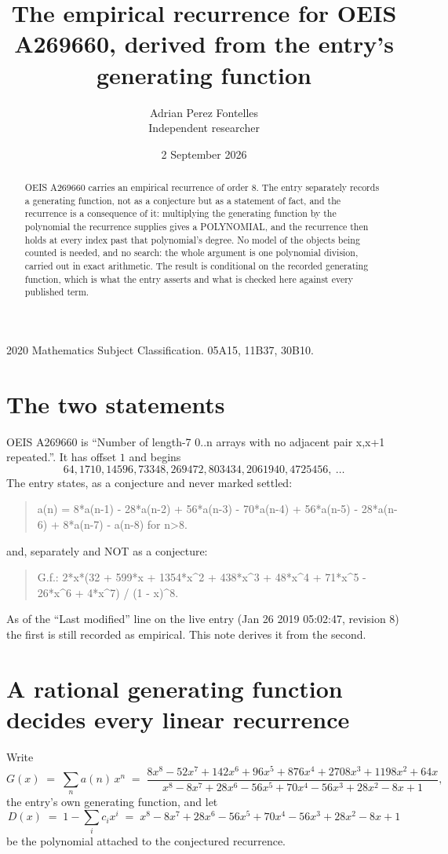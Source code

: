 \documentclass[11pt,a4paper]{article}
\title{The empirical recurrence for OEIS A269660, derived from the entry's generating function}
\author{Adrian Perez Fontelles\\ \small Independent researcher}
\date{2 September 2026}
\theoremstyle{plain}
\theoremstyle{definition}
\begin{document}
\maketitle

\begin{abstract}
OEIS A269660 carries an empirical recurrence of order $8$. The entry separately records a
generating function, not as a conjecture but as a statement of fact, and the recurrence is a
consequence of it: multiplying the generating function by the polynomial the recurrence
supplies gives a POLYNOMIAL, and the recurrence then holds at every index past that
polynomial's degree. No model of the objects being counted is needed, and no search: the
whole argument is one polynomial division, carried out in exact arithmetic. The result is
conditional on the recorded generating function, which is what the entry asserts and what is
checked here against every published term.
\end{abstract}

\noindent\small 2020 Mathematics Subject Classification. 05A15, 11B37, 30B10.\normalsize

\section{The two statements}

OEIS A269660 is ``Number of length-7 0..n arrays with no adjacent pair x,x+1 repeated.''. It has offset $1$ and begins
\[
64, 1710, 14596, 73348, 269472, 803434, 2061940, 4725456,\ \dots
\]
The entry states, as a conjecture and never marked settled:
\begin{quote}
a(n) = 8*a(n-1) - 28*a(n-2) + 56*a(n-3) - 70*a(n-4) + 56*a(n-5) - 28*a(n-6) + 8*a(n-7) - a(n-8) for n>8.
\end{quote}
and, separately and NOT as a conjecture:
\begin{quote}
G.f.: 2*x*(32 + 599*x + 1354*x\^{}2 + 438*x\^{}3 + 48*x\^{}4 + 71*x\^{}5 - 26*x\^{}6 + 4*x\^{}7) / (1 - x)\^{}8.
\end{quote}
As of the ``Last modified'' line on the live entry (Jan 26 2019 05:02:47, revision 8) the first is still
recorded as empirical. This note derives it from the second.

\section{A rational generating function decides every linear recurrence}

Write
\[
G(x)\;=\;\sum_{n}a(n)\,x^{n}\;=\;\frac{8 x^{8} - 52 x^{7} + 142 x^{6} + 96 x^{5} + 876 x^{4} + 2708 x^{3} + 1198 x^{2} + 64 x}{x^{8} - 8 x^{7} + 28 x^{6} - 56 x^{5} + 70 x^{4} - 56 x^{3} + 28 x^{2} - 8 x + 1},
\]
the entry's own generating function, and let
\[
D(x)\;=\;1-\sum_i c_i x^{i}\;=\;x^{8} - 8 x^{7} + 28 x^{6} - 56 x^{5} + 70 x^{4} - 56 x^{3} + 28 x^{2} - 8 x + 1
\]
be the polynomial attached to the conjectured recurrence.
\end{document}

